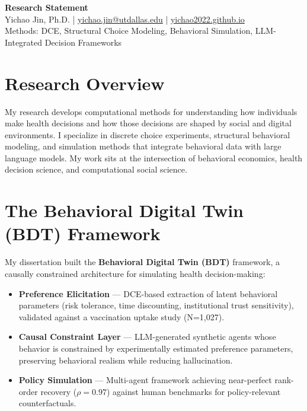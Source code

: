 \documentclass[11pt,a4paper]{article}
\begin{document}
\pagestyle{empty}

\begin{center}
    {\Large \bfseries \sffamily \color{slate} Research Statement} \\
    \vspace{0.2cm}
    {\small Yichao Jin, Ph.D. \quad | \quad \href{mailto:yichao.jin@utdallas.edu}{yichao.jin@utdallas.edu} \quad | \quad \href{https://yichao2022.github.io}{yichao2022.github.io}} \\
    {\small Methods: DCE, Structural Choice Modeling, Behavioral Simulation, LLM-Integrated Decision Frameworks}
\end{center}

\vspace{0.15cm}

\section*{Research Overview}

My research develops computational methods for understanding how individuals make health decisions and how those decisions are shaped by social and digital environments. I specialize in discrete choice experiments, structural behavioral modeling, and simulation methods that integrate behavioral data with large language models. My work sits at the intersection of behavioral economics, health decision science, and computational social science.

\section*{The Behavioral Digital Twin (BDT) Framework}

My dissertation built the \textbf{Behavioral Digital Twin (BDT)} framework, a causally constrained architecture for simulating health decision-making:

\begin{itemize}[leftmargin=*, nosep]
    \item \textbf{Preference Elicitation} --- DCE-based extraction of latent behavioral parameters (risk tolerance, time discounting, institutional trust sensitivity), validated against a vaccination uptake study (N=1,027).
    \item \textbf{Causal Constraint Layer} --- LLM-generated synthetic agents whose behavior is constrained by experimentally estimated preference parameters, preserving behavioral realism while reducing hallucination.
    \item \textbf{Policy Simulation} --- Multi-agent framework achieving near-perfect rank-order recovery ($\rho = 0.97$) against human benchmarks for policy-relevant counterfactuals.
\end{itemize}
\end{document}
